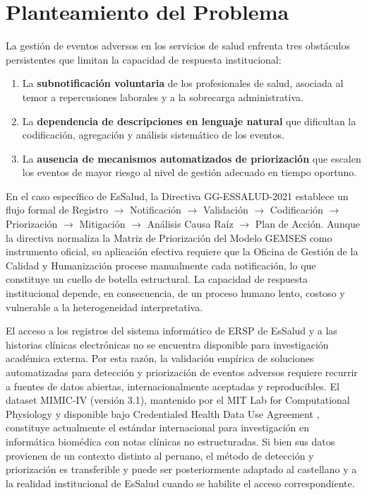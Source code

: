 \section{Planteamiento del Problema}

La gestión de eventos adversos en los servicios de salud enfrenta tres obstáculos persistentes que limitan la capacidad de respuesta institucional:
\begin{enumerate}
    \item La \textbf{subnotificación voluntaria} de los profesionales de salud, asociada al temor a repercusiones laborales y a la sobrecarga administrativa.
    \item La \textbf{dependencia de descripciones en lenguaje natural} que dificultan la codificación, agregación y análisis sistemático de los eventos.
    \item La \textbf{ausencia de mecanismos automatizados de priorización} que escalen los eventos de mayor riesgo al nivel de gestión adecuado en tiempo oportuno.
\end{enumerate}

En el caso específico de EsSalud, la Directiva GG-ESSALUD-2021 establece un flujo formal de Registro $\rightarrow$ Notificación $\rightarrow$ Validación $\rightarrow$ Codificación $\rightarrow$ Priorización $\rightarrow$ Mitigación $\rightarrow$ Análisis Causa Raíz $\rightarrow$ Plan de Acción. Aunque la directiva normaliza la Matriz de Priorización del Modelo GEMSES como instrumento oficial, su aplicación efectiva requiere que la Oficina de Gestión de la Calidad y Humanización procese manualmente cada notificación, lo que constituye un cuello de botella estructural. La capacidad de respuesta institucional depende, en consecuencia, de un proceso humano lento, costoso y vulnerable a la heterogeneidad interpretativa.

El acceso a los registros del sistema informático de ERSP de EsSalud y a las historias clínicas electrónicas no se encuentra disponible para investigación académica externa. Por esta razón, la validación empírica de soluciones automatizadas para detección y priorización de eventos adversos requiere recurrir a fuentes de datos abiertas, internacionalmente aceptadas y reproducibles. El dataset MIMIC-IV (versión 3.1), mantenido por el MIT Lab for Computational Physiology y disponible bajo Credentialed Health Data Use Agreement \citep{johnson2023mimic, mimic-iv-note}, constituye actualmente el estándar internacional para investigación en informática biomédica con notas clínicas no estructuradas. Si bien sus datos provienen de un contexto distinto al peruano, el método de detección y priorización es transferible y puede ser posteriormente adaptado al castellano y a la realidad institucional de EsSalud cuando se habilite el acceso correspondiente.

